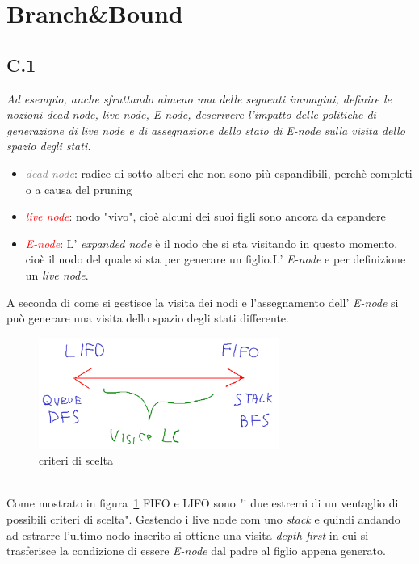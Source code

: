 \documentclass[a4paper]{article}
\begin{document}
\section{Branch\&Bound}
\subsection{C.1}
\label{SEC:C_1}
\emph{Ad esempio, anche sfruttando almeno una delle seguenti immagini, definire le nozioni dead node, live node, E-node, descrivere l’impatto delle politiche di generazione di live node e di assegnazione dello stato di E-node sulla visita dello spazio degli stati.}


\begin{itemize}
	\item \textcolor{gray}{\textit{dead node}}: radice di sotto-alberi che non sono più espandibili, perchè completi o a causa del pruning
		\item \textcolor{red}{\textit{live node}}: nodo "vivo", cioè alcuni dei suoi figli sono ancora da espandere
		\item \textcolor{red}{\textit{E-node}}: L' \textit{expanded node} è il nodo che si sta visitando in questo momento, cioè il nodo del quale si sta per generare un figlio.L' \textit{E-node} e per definizione un \textit{live node}.
\end{itemize}
A seconda di come si gestisce la visita dei nodi e l'assegnamento dell' \textit{E-node} si può generare una visita dello spazio degli stati differente.
\begin{figure}[!ht]
\centering
\includegraphics[width=0.7\textwidth]{./img/C_1.png}
\caption{criteri di scelta} \label{FIG:C_1}
\end{figure}\\
Come mostrato in figura~\ref{FIG:C_1} FIFO e LIFO sono "i due estremi di un ventaglio di possibili criteri di scelta".
Gestendo i live node com uno \emph{stack} e quindi andando ad estrarre l'ultimo nodo inserito si ottiene una visita \textit{depth-first} in cui si trasferisce la condizione di essere \textit{E-node} dal padre al figlio appena generato.
\end{document}
